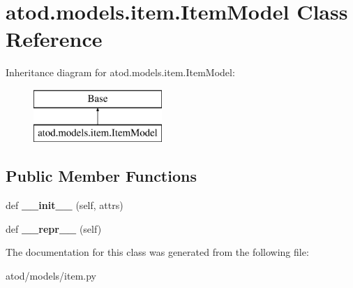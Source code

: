 \hypertarget{classatod_1_1models_1_1item_1_1_item_model}{}\section{atod.\+models.\+item.\+Item\+Model Class Reference}
\label{classatod_1_1models_1_1item_1_1_item_model}
Inheritance diagram for atod.\+models.\+item.\+Item\+Model\+:\begin{figure}[H]
\begin{center}
\leavevmode
\includegraphics[height=2.000000cm]{classatod_1_1models_1_1item_1_1_item_model}
\end{center}
\end{figure}
\subsection*{Public Member Functions}
\begin{DoxyCompactItemize}
\item 
def {\bfseries \+\_\+\+\_\+init\+\_\+\+\_\+} (self, attrs)\hypertarget{classatod_1_1models_1_1item_1_1_item_model_afc641e705e3b63c23a40011bcf93c2a8}{}\label{classatod_1_1models_1_1item_1_1_item_model_afc641e705e3b63c23a40011bcf93c2a8}

\item 
def {\bfseries \+\_\+\+\_\+repr\+\_\+\+\_\+} (self)\hypertarget{classatod_1_1models_1_1item_1_1_item_model_af8fedb7b227633ef4ef5e28ef710e357}{}\label{classatod_1_1models_1_1item_1_1_item_model_af8fedb7b227633ef4ef5e28ef710e357}

\end{DoxyCompactItemize}


The documentation for this class was generated from the following file\+:\begin{DoxyCompactItemize}
\item 
atod/models/item.\+py\end{DoxyCompactItemize}
